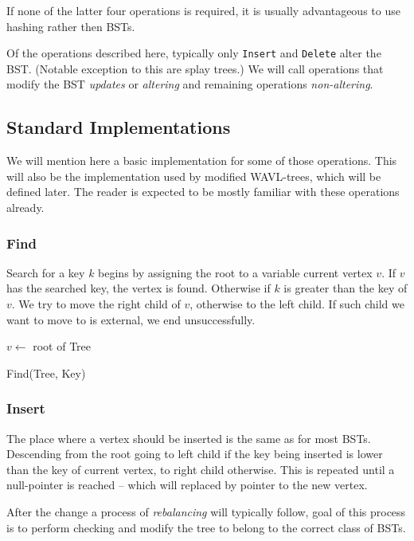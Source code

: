 If none of the latter four operations is required, it is usually advantageous to use hashing rather then BSTs.

Of the operations described here, typically only \texttt{Insert} and \texttt{Delete} alter the BST. (Notable exception to this are splay trees.) We will call operations that modify the BST {\em updates} or {\em altering} and remaining operations {\em non-altering}.

\subsection{Standard Implementations}

We will mention here a basic implementation for some of those operations. This will also be the implementation used by modified WAVL-trees, which will be defined later. The reader is expected to be mostly familiar with these operations already.

\subsubsection*{Find}
Search for a key $k$ begins by assigning the root to a variable current vertex $v$. If $v$ has the searched key, the vertex is found. Otherwise if $k$ is greater than the key of $v$. We try to move the right child of $v$, otherwise to the left child. If such child we want to move to is external, we end unsuccessfully. 

\begin{algorithm}
	\small
	\SetAlgoLined
	$v \gets $ root of Tree\;
	\caption{Find(Tree, Key)}
\end{algorithm}


\subsubsection*{Insert}
The place where a vertex should be inserted is the same as for most BSTs. Descending from the root going to left child if the key being inserted is lower than the key of current vertex, to right child otherwise. This is repeated until a null-pointer is reached -- which will replaced by pointer to the new vertex. 

After the change a process of \textit{rebalancing} will typically follow, goal of this process is to perform checking and modify the tree to belong to the correct class of BSTs.

